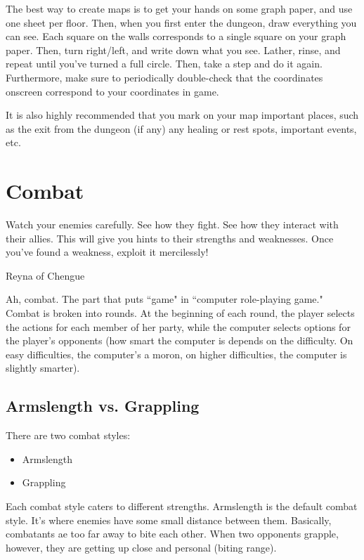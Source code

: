 \documentclass{report}
\begin{document}
\begin{itemize}
\begin{itemize}
    The best way to create maps is to get your hands on some graph paper, and
    use one sheet per floor. Then, when you first enter the dungeon, draw
    everything you can see. Each square on the walls corresponds to a single 
    square on your graph paper. Then, turn right/left, and write down what you
    see. Lather, rinse, and repeat until you've turned a full circle. Then, take a 
    step and do it again. Furthermore, make sure to periodically double-check
    that the coordinates onscreen correspond to your coordinates in game.

    It is also highly recommended that you mark on your map important places,
    such as the exit from the dungeon (if any) any healing or rest spots, important
    events, etc.

\chapter{Combat}
\label{ch_combat}
\epigraph{Watch your enemies carefully. See how they fight. See how
they interact with their allies. This will give you hints to their strengths and
weaknesses. Once you've found a weakness, exploit it mercilessly!}{Reyna of 
Chengue} 

Ah, combat. The part that puts ``game" in ``computer role-playing game." Combat
is broken into rounds. At the beginning of each round, the player selects the 
actions for each member of her party, while the computer selects options for the
player's opponents (how smart the computer is depends on the difficulty. On easy
difficulties, the computer's a moron, on higher difficulties, the computer is
slightly smarter).

\section{Armslength vs. Grappling}

There are two combat styles:
\begin{itemize}
    \item Armslength
    \item Grappling
\end{itemize}

Each combat style caters to different strengths. Armslength is the default combat
style. It's where enemies have some small distance between them. Basically, combatants ae too far
away to bite each other. When two opponents grapple, however, they are getting
up close and personal (biting range).


\end{itemize}
\end{itemize}
\end{document}
